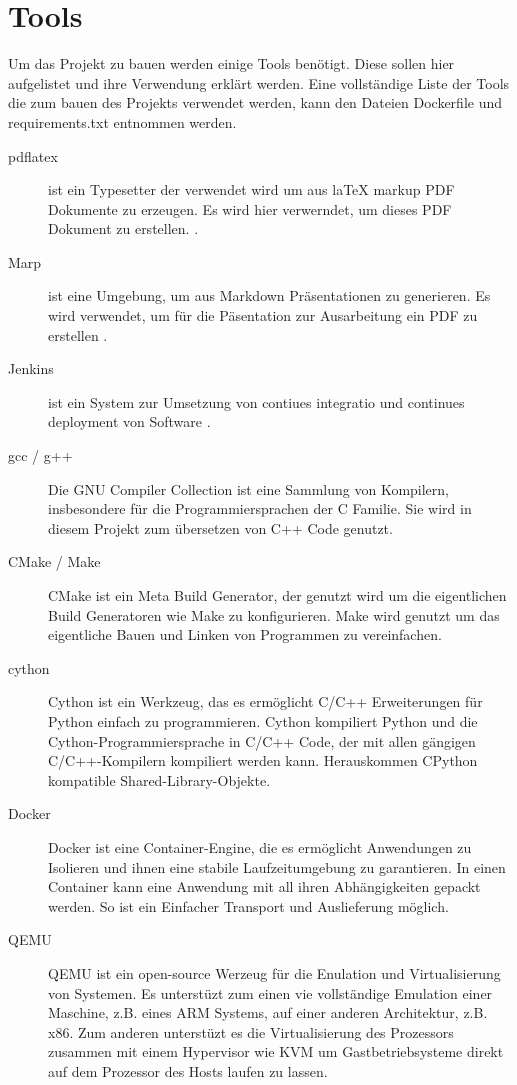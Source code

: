 \chapter{Tools}
\label{chap:tools}

Um das Projekt zu bauen werden einige Tools benötigt. Diese sollen hier aufgelistet und ihre Verwendung erklärt werden.
Eine vollständige Liste der Tools die zum bauen des Projekts verwendet werden, kann den Dateien \glqq Dockerfile \grqq{} und \glqq requirements.txt \grqq{} entnommen werden.

\begin{description}
    \item[pdflatex] ist ein Typesetter der verwendet wird um aus laTeX markup PDF Dokumente zu erzeugen. Es wird hier verwerndet, um dieses PDF Dokument zu erstellen. \cite{MANLATEX}.
    \item[Marp] ist eine Umgebung, um aus Markdown Präsentationen zu generieren. Es wird verwendet, um für die Päsentation zur Ausarbeitung ein PDF zu erstellen \cite{MARP2024}.
    \item[Jenkins] ist ein System zur Umsetzung von \glqq contiues integratio \grqq{} und \glqq continues deployment\grqq{} von Software \cite{JENKINS2024}.
    \item[gcc / g++] Die GNU Compiler Collection ist eine Sammlung von Kompilern, insbesondere für die Programmiersprachen der C Familie\cite{GCC2024}. Sie wird in diesem Projekt zum übersetzen von C++ Code genutzt.
    \item[CMake / Make] CMake ist ein Meta Build Generator, der genutzt wird um die eigentlichen Build Generatoren wie Make zu konfigurieren. Make wird genutzt um das eigentliche Bauen und Linken von Programmen zu vereinfachen\cite{CMAKE2024}.
    \item[cython] Cython ist ein Werkzeug, das es ermöglicht C/C++ Erweiterungen für Python einfach zu programmieren. Cython kompiliert Python und die Cython-Programmiersprache in C/C++ Code, der mit allen gängigen C/C++-Kompilern kompiliert werden kann. Herauskommen CPython kompatible Shared-Library-Objekte\cite{behnel2011}.
    \item[Docker] Docker ist eine Container-Engine, die es ermöglicht Anwendungen zu Isolieren und ihnen eine stabile Laufzeitumgebung zu garantieren. In einen Container kann eine Anwendung mit all ihren Abhängigkeiten gepackt werden. So ist ein Einfacher Transport und Auslieferung möglich\cite{merkel2014}.
    \item[QEMU] QEMU ist ein open-source Werzeug für die Enulation und Virtualisierung von Systemen. Es unterstüzt zum einen vie vollständige Emulation einer Maschine, z.B. eines ARM Systems, auf einer anderen Architektur, z.B. x86. Zum anderen unterstüzt es die Virtualisierung des Prozessors zusammen mit einem Hypervisor wie KVM um Gastbetriebsysteme direkt auf dem Prozessor des Hosts laufen zu lassen\cite{Bellard2005}.

\end{description}
